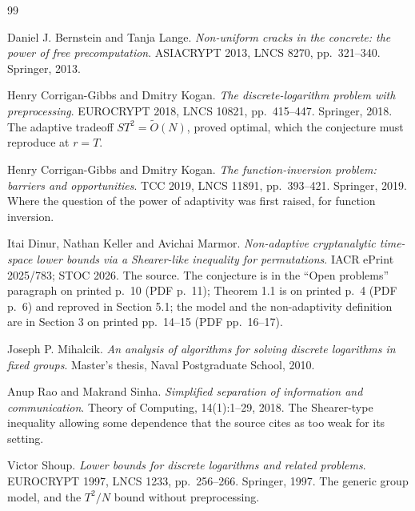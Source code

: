 \documentclass{conjura-conjecture}
\newcommand{\Ot}{\widetilde{O}}
\begin{document}
\begin{conjurabibliography}{99}

Daniel J. Bernstein and Tanja Lange.
\emph{Non-uniform cracks in the concrete: the power of free
precomputation}.
ASIACRYPT 2013, LNCS 8270, pp.\ 321--340. Springer, 2013.

Henry Corrigan-Gibbs and Dmitry Kogan.
\emph{The discrete-logarithm problem with preprocessing}.
EUROCRYPT 2018, LNCS 10821, pp.\ 415--447. Springer, 2018.
The adaptive tradeoff $ST^{2} = \Ot(N)$, proved optimal, which the
conjecture must reproduce at $r = T$.

Henry Corrigan-Gibbs and Dmitry Kogan.
\emph{The function-inversion problem: barriers and opportunities}.
TCC 2019, LNCS 11891, pp.\ 393--421. Springer, 2019.
Where the question of the power of adaptivity was first raised, for
function inversion.

Itai Dinur, Nathan Keller and Avichai Marmor.
\emph{Non-adaptive cryptanalytic time-space lower bounds via a
Shearer-like inequality for permutations}.
IACR ePrint 2025/783; STOC 2026.
The source. The conjecture is in the ``Open problems'' paragraph on
printed p.\ 10 (PDF p.\ 11); Theorem 1.1 is on printed p.\ 4 (PDF
p.\ 6) and reproved in Section 5.1; the model and the non-adaptivity
definition are in Section 3 on printed pp.\ 14--15 (PDF pp.\ 16--17).

Joseph P. Mihalcik.
\emph{An analysis of algorithms for solving discrete logarithms in
fixed groups}.
Master's thesis, Naval Postgraduate School, 2010.

Anup Rao and Makrand Sinha.
\emph{Simplified separation of information and communication}.
Theory of Computing, 14(1):1--29, 2018.
The Shearer-type inequality allowing some dependence that the source
cites as too weak for its setting.

Victor Shoup.
\emph{Lower bounds for discrete logarithms and related problems}.
EUROCRYPT 1997, LNCS 1233, pp.\ 256--266. Springer, 1997.
The generic group model, and the $T^{2}/N$ bound without preprocessing.

\end{conjurabibliography}
\end{document}

